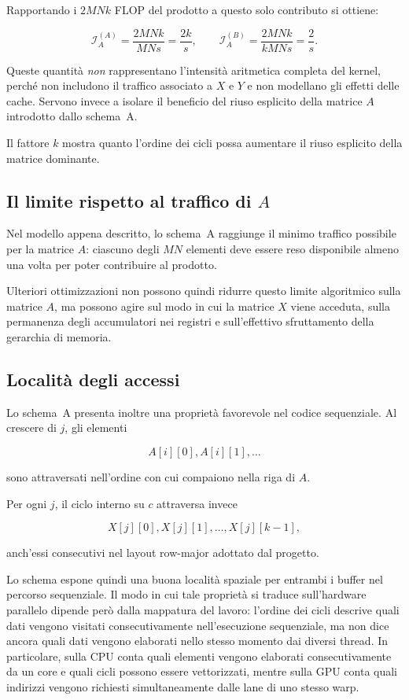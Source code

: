 Rapportando i $2MNk$ FLOP del prodotto a questo solo contributo si ottiene:

\begin{equation}
\mathcal{I}_{A}^{(A)}
=
\frac{2MNk}{MNs}
=
\frac{2k}{s},
\qquad
\mathcal{I}_{A}^{(B)}
=
\frac{2MNk}{kMNs}
=
\frac{2}{s}.
\label{eq:intensita-a}
\end{equation}

Queste quantità \emph{non} rappresentano l'intensità aritmetica completa del
kernel, perché non includono il traffico associato a $X$ e $Y$ e non
modellano gli effetti delle cache. Servono invece a isolare il beneficio
del riuso esplicito della matrice $A$ introdotto dallo schema~A.

Il fattore $k$ mostra quanto l'ordine dei cicli possa aumentare il riuso
esplicito della matrice dominante.

\subsection{Il limite rispetto al traffico di $A$}

Nel modello appena descritto, lo schema~A raggiunge il minimo traffico
possibile per la matrice $A$: ciascuno degli $MN$ elementi deve essere reso
disponibile almeno una volta per poter contribuire al prodotto.

Ulteriori ottimizzazioni non possono quindi ridurre questo limite
algoritmico sulla matrice $A$, ma possono agire sul modo in cui la matrice $X$ viene acceduta,
sulla permanenza degli accumulatori nei registri e sull'effettivo
sfruttamento della gerarchia di memoria.

\subsection{Località degli accessi}

Lo schema~A presenta inoltre una proprietà favorevole nel codice
sequenziale. Al crescere di $j$, gli elementi

\[
A[i][0],A[i][1],\ldots
\]

sono attraversati nell'ordine con cui compaiono nella riga di $A$.

Per ogni $j$, il ciclo interno su $c$ attraversa invece

\[
X[j][0],X[j][1],\ldots,X[j][k-1],
\]

anch'essi consecutivi nel layout row-major adottato dal progetto.

Lo schema espone quindi una buona località spaziale per entrambi i buffer
nel percorso sequenziale. Il modo in cui tale proprietà si traduce
sull'hardware parallelo dipende però dalla mappatura del lavoro:
l'ordine dei cicli descrive quali dati vengono visitati consecutivamente
nell'esecuzione sequenziale, ma non dice ancora quali dati vengono
elaborati nello stesso momento dai diversi thread. In particolare, sulla CPU conta quali elementi vengono elaborati
consecutivamente da un core e quali cicli possono essere vettorizzati,
mentre sulla GPU conta quali indirizzi vengono richiesti simultaneamente
dalle lane di uno stesso warp.

